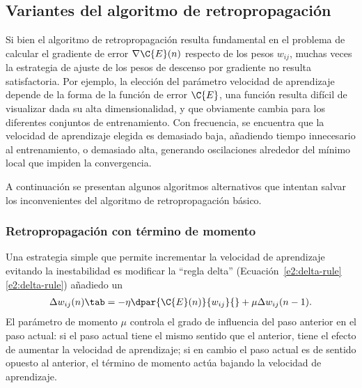 %
\subsection{Variantes del algoritmo de retropropagación}
%
Si bien el algoritmo de retropropagación resulta fundamental en el
problema de calcular el gradiente de error $\nabla{\C{E}(n)}$ respecto
de los pesos $w_{ij}$, muchas veces la estrategia de ajuste de los
pesos de descenso por gradiente no resulta satisfactoria.  Por
ejemplo, la elección del parámetro velocidad de aprendizaje depende de
la forma de la función de error $\C{E}$, una función resulta difícil
de visualizar dada su alta dimensionalidad, y que obviamente cambia
para los diferentes conjuntos de entrenamiento.
Con frecuencia, se encuentra que la velocidad de aprendizaje elegida
es demasiado baja, añadiendo tiempo innecesario al entrenamiento, o
demasiado alta, generando oscilaciones alrededor del mínimo local que
impiden la convergencia.

A continuación se presentan algunos algoritmos alternativos que
intentan salvar los inconvenientes del algoritmo de retropropagación
básico.
%
\subsubsection{Retropropagación con término de momento}
%
Una estrategia simple que permite incrementar la velocidad de aprendizaje
evitando la inestabilidad es modificar la ``regla delta''
(\iflatexml{}Ecuación~\ref{e2:delta-rule}\else\autoref{e2:delta-rule}\fi)
añadiedo un 
%
\begin{align}\label{e2:momentum-term}
  \Delta w_{ij}(n)\tab=-\eta\dpar{\C{E}(n)}{w_{ij}}{}
  +\mu\Delta w_{ij}(n-1).
\end{align}
%
El parámetro de momento $\mu$ controla el grado de influencia del paso
anterior en el paso actual: si el paso actual tiene el mismo sentido
que el anterior, tiene el efecto de aumentar la velocidad de
aprendizaje; si en cambio el paso actual es de sentido opuesto al
anterior, el término de momento actúa bajando la velocidad de
aprendizaje.

